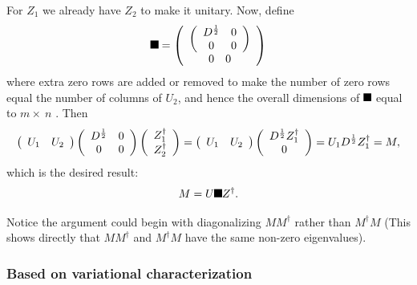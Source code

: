 \documentclass[aps,preprint]{revtex4}%
\providecommand{\U}[1]{\protect\rule{.1in}{.1in}}
\begin{document}
For $Z_{1}$ we already have $Z_{2}$ to make it unitary. Now, define%
\begin{equation}
\U{3a3} =\left(
\begin{array}
[c]{c}%
\left(
\begin{array}
[c]{cc}%
D^{\frac{1}{2}} & 0\\
0 & 0
\end{array}
\right) \\%
\begin{array}
[c]{cc}%
0 & 0
\end{array}
\end{array}
\right)
\end{equation}
where extra zero rows are added or removed to make the number of zero rows
equal the number of columns of $U_{2}$, and hence the overall dimensions of
$\U{3a3} $ equal to $m\times\ n$ . Then%
\begin{equation}
\left(
\begin{array}
[c]{cc}%
U_{1} & U_{2}%
\end{array}
\right)  \left(
\begin{array}
[c]{cc}%
D^{\frac{1}{2}} & 0\\
0 & 0
\end{array}
\right)  \left(
\begin{array}
[c]{c}%
Z_{1}^{\dagger}\\
Z_{2}^{\dagger}%
\end{array}
\right)  =\left(
\begin{array}
[c]{cc}%
U_{1} & U_{2}%
\end{array}
\right)  \left(
\begin{array}
[c]{c}%
D^{\frac{1}{2}}Z_{1}^{\dagger}\\
0
\end{array}
\right)  =U_{1}D^{\frac{1}{2}}Z_{1}^{\dagger}=M,
\end{equation}
which is the desired result:%
\begin{equation}
M=U\U{3a3} Z^{\dagger}.
\end{equation}


Notice the argument could begin with diagonalizing $MM^{\dagger}$ rather than
$M^{\dagger}M$ (This shows directly that $MM^{\dagger}$ and $M^{\dagger}M$
have the same non-zero eigenvalues).

\subsubsection{Based on variational characterization}
\end{document}
